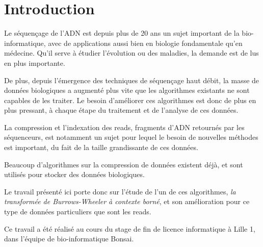 \section*{Introduction} %

Le séquençage de l'ADN est depuis plus de 20 ans un sujet important de la bio-informatique, avec de applications aussi bien en biologie fondamentale qu'en médecine. Qu'il serve à étudier l'évolution ou des maladies, la demande est de lus en plus importante.

De plus, depuis l'émergence des techniques de séquençage haut débit, la masse de données biologiques a augmenté plus vite que les algorithmes existants ne sont capables de les traiter. Le besoin d'améliorer ces algorithmes est donc de plus en plus pressant, à chaque étape du traitement et de l'analyse de ces données.

La compression et l'indexation des reads, fragments d'ADN retournés par les séquenceurs, est notamment un sujet pour lequel le besoin de nouvelles méthodes est important, du fait de la taille grandissante de ces données.

Beaucoup d'algorithmes sur la compression de données existent déjà, et sont utilisés pour stocker des données biologiques. 

Le travail présenté ici porte donc sur l'étude de l'un de ces algorithmes, \textit{la transformée de Burrows-Wheeler à contexte borné}, et son amélioration pour ce type de données particuliers que sont les reads.

Ce travail a été réalisé au cours du stage de fin de licence informatique à Lille 1, dans l'équipe de bio-informatique Bonsai.





